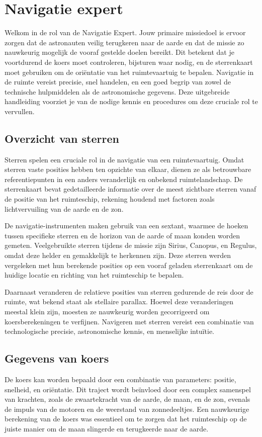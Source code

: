 \section{Navigatie expert}

Welkom in de rol van de Navigatie Expert. Jouw primaire missiedoel is ervoor zorgen dat de astronauten veilig terugkeren naar de aarde en dat de missie zo nauwkeurig mogelijk de vooraf gestelde doelen bereikt. Dit betekent dat je voortdurend de koers moet controleren, bijsturen waar nodig, en de sterrenkaart moet gebruiken om de oriëntatie van het ruimtevaartuig te bepalen. Navigatie in de ruimte vereist precisie, snel handelen, en een goed begrip van zowel de technische hulpmiddelen als de astronomische gegevens. Deze uitgebreide handleiding voorziet je van de nodige kennis en procedures om deze cruciale rol te vervullen.

\subsection{Overzicht van sterren}
Sterren spelen een cruciale rol in de navigatie van een ruimtevaartuig. Omdat sterren vaste posities hebben ten opzichte van elkaar, dienen ze als betrouwbare referentiepunten in een anders veranderlijk en onbekend ruimtelandschap. De sterrenkaart bevat gedetailleerde informatie over de meest zichtbare sterren vanaf de positie van het ruimteschip, rekening houdend met factoren zoals lichtvervuiling van de aarde en de zon.

De navigatie-instrumenten maken gebruik van een sextant, waarmee de hoeken tussen specifieke sterren en de horizon van de aarde of maan konden worden gemeten. Veelgebruikte sterren tijdens de missie zijn Sirius, Canopus, en Regulus, omdat deze helder en gemakkelijk te herkennen zijn. Deze sterren werden vergeleken met hun berekende posities op een vooraf geladen sterrenkaart om de huidige locatie en richting van het ruimteschip te bepalen.

Daarnaast veranderen de relatieve posities van sterren gedurende de reis door de ruimte, wat bekend staat als stellaire parallax. Hoewel deze veranderingen meestal klein zijn, moesten ze nauwkeurig worden gecorrigeerd om koersberekeningen te verfijnen. Navigeren met sterren vereist een combinatie van technologische precisie, astronomische kennis, en menselijke intuïtie.


\subsection{Gegevens van koers}
De koers kan worden bepaald door een combinatie van parameters: positie, snelheid, en oriëntatie. Dit traject wordt beïnvloed door een complex samenspel van krachten, zoals de zwaartekracht van de aarde, de maan, en de zon, evenals de impuls van de motoren en de weerstand van zonnedeeltjes. Een nauwkeurige berekening van de koers was essentieel om te zorgen dat het ruimteschip op de juiste manier om de maan slingerde en terugkeerde naar de aarde.

